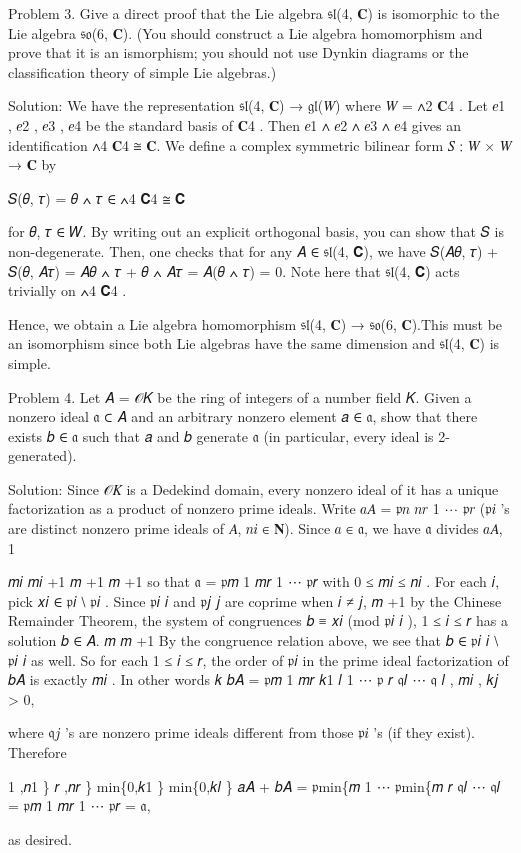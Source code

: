 \documentclass[UTF8,12pt]{ctexart}
\begin{document}
Problem 3. Give a direct proof that the Lie algebra 𝔰𝔩(4, 𝐂) is isomorphic to the Lie algebra 𝔰𝔬(6, 𝐂). (You should construct a Lie algebra homomorphism and prove that it is an ismorphism; you should not use Dynkin diagrams or the classification theory of simple Lie algebras.)

Solution: We have the representation 𝔰𝔩(4, 𝐂) → 𝔤𝔩(𝑊) where 𝑊 = ∧2 𝐂4 . Let 𝑒1 , 𝑒2 , 𝑒3 , 𝑒4 be the standard basis of 𝐂4 . Then 𝑒1 ∧ 𝑒2 ∧ 𝑒3 ∧ 𝑒4 gives an identification ∧4 𝐂4 ≅ 𝐂. We define a complex symmetric bilinear form 𝑆 ∶ 𝑊 × 𝑊 → 𝐂 by

𝑆(𝜃, 𝜏) = 𝜃 ∧ 𝜏 ∈ ∧4 𝐂4 ≅ 𝐂

for 𝜃, 𝜏 ∈ 𝑊. By writing out an explicit orthogonal basis, you can show that 𝑆 is non-degenerate. Then, one checks that for any 𝐴 ∈ 𝔰𝔩(4, 𝐂), we have 𝑆(𝐴𝜃, 𝜏) + 𝑆(𝜃, 𝐴𝜏) = 𝐴𝜃 ∧ 𝜏 + 𝜃 ∧ 𝐴𝜏 = 𝐴(𝜃 ∧ 𝜏) = 0. Note here that 𝔰𝔩(4, 𝐂) acts trivially on ∧4 𝐂4 .

Hence, we obtain a Lie algebra homomorphism 𝔰𝔩(4, 𝐂) → 𝔰𝔬(6, 𝐂).This must be an isomorphism since both Lie algebras have the same dimension and 𝔰𝔩(4, 𝐂) is simple.

Problem 4. Let 𝐴 = 𝒪𝐾 be the ring of integers of a number field 𝐾. Given a nonzero ideal 𝔞 ⊂ 𝐴 and an arbitrary nonzero element 𝑎 ∈ 𝔞, show that there exists 𝑏 ∈ 𝔞 such that 𝑎 and 𝑏 generate 𝔞 (in particular, every ideal is 2-generated).

Solution: Since 𝒪𝐾 is a Dedekind domain, every nonzero ideal of it has a unique factorization as a product of nonzero prime ideals. Write 𝑎𝐴 = 𝔭𝑛 𝑛𝑟 1 ⋯ 𝔭𝑟 (𝔭𝑖 ’s are distinct nonzero prime ideals of 𝐴, 𝑛𝑖 ∈ 𝐍). Since 𝑎 ∈ 𝔞, we have 𝔞 divides 𝑎𝐴, 1

𝑚𝑖 𝑚𝑖 +1 𝑚 +1 𝑚 +1 so that 𝔞 = 𝔭𝑚 1 𝑚𝑟 1 ⋯ 𝔭𝑟 with 0 ≤ 𝑚𝑖 ≤ 𝑛𝑖 . For each 𝑖, pick 𝑥𝑖 ∈ 𝔭𝑖 ⧵ 𝔭𝑖 . Since 𝔭𝑖 𝑖 and 𝔭𝑗 𝑗 are coprime when 𝑖 ≠ 𝑗, 𝑚 +1 by the Chinese Remainder Theorem, the system of congruences 𝑏 ≡ 𝑥𝑖 (mod 𝔭𝑖 𝑖 ), 1 ≤ 𝑖 ≤ 𝑟 has a solution 𝑏 ∈ 𝐴. 𝑚 𝑚 +1 By the congruence relation above, we see that 𝑏 ∈ 𝔭𝑖 𝑖 ⧵ 𝔭𝑖 𝑖 as well. So for each 1 ≤ 𝑖 ≤ 𝑟, the order of 𝔭𝑖 in the prime ideal factorization of 𝑏𝐴 is exactly 𝑚𝑖 . In other words 𝑘 𝑏𝐴 = 𝔭𝑚 1 𝑚𝑟 𝑘1 𝑙 1 ⋯ 𝔭 𝑟 𝔮𝑙 ⋯ 𝔮 𝑙 , 𝑚𝑖 , 𝑘𝑗 > 0,

where 𝔮𝑗 ’s are nonzero prime ideals different from those 𝔭𝑖 ’s (if they exist). Therefore

1 ,𝑛1 \} 𝑟 ,𝑛𝑟 \} min\{0,𝑘1 \} min\{0,𝑘𝑙 \} 𝑎𝐴 + 𝑏𝐴 = 𝔭min\{𝑚 1 ⋯ 𝔭min\{𝑚 𝑟 𝔮𝑙 ⋯ 𝔮𝑙 = 𝔭𝑚 1 𝑚𝑟 1 ⋯ 𝔭𝑟 = 𝔞,

as desired.
\end{document}
